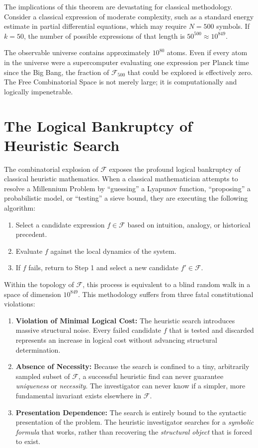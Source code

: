 \documentclass[12pt,openany]{extbook}
\theoremstyle{plain}
\theoremstyle{definition}
\begin{document}
The implications of this theorem are devastating for classical methodology. Consider a classical expression of moderate complexity, such as a standard energy estimate in partial differential equations, which may require $N = 500$ symbols. If $k = 50$, the number of possible expressions of that length is $50^{500} \approx 10^{849}$. 

The observable universe contains approximately $10^{80}$ atoms. Even if every atom in the universe were a supercomputer evaluating one expression per Planck time since the Big Bang, the fraction of $\mathcal{F}_{500}$ that could be explored is effectively zero. The Free Combinatorial Space is not merely large; it is computationally and logically impenetrable.

\section{The Logical Bankruptcy of Heuristic Search}

The combinatorial explosion of $\mathcal{F}$ exposes the profound logical bankruptcy of classical heuristic mathematics. When a classical mathematician attempts to resolve a Millennium Problem by ``guessing'' a Lyapunov function, ``proposing'' a probabilistic model, or ``testing'' a sieve bound, they are executing the following algorithm:

\begin{enumerate}
    \item Select a candidate expression $f \in \mathcal{F}$ based on intuition, analogy, or historical precedent.
    \item Evaluate $f$ against the local dynamics of the system.
    \item If $f$ fails, return to Step 1 and select a new candidate $f' \in \mathcal{F}$.
\end{enumerate}

Within the topology of $\mathcal{F}$, this process is equivalent to a blind random walk in a space of dimension $10^{849}$. This methodology suffers from three fatal constitutional violations:

\begin{enumerate}
    \item \textbf{Violation of Minimal Logical Cost:} The heuristic search introduces massive structural noise. Every failed candidate $f$ that is tested and discarded represents an increase in logical cost without advancing structural determination.
    \item \textbf{Absence of Necessity:} Because the search is confined to a tiny, arbitrarily sampled subset of $\mathcal{F}$, a successful heuristic find can never guarantee \emph{uniqueness} or \emph{necessity}. The investigator can never know if a simpler, more fundamental invariant exists elsewhere in $\mathcal{F}$.
    \item \textbf{Presentation Dependence:} The search is entirely bound to the syntactic presentation of the problem. The heuristic investigator searches for a \emph{symbolic formula} that works, rather than recovering the \emph{structural object} that is forced to exist.
\end{enumerate}
\end{document}
